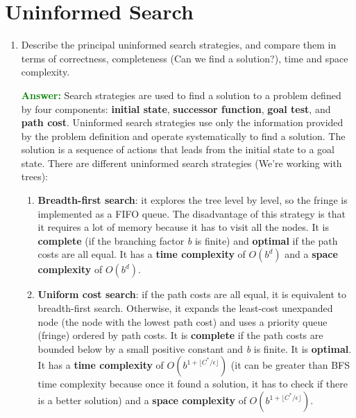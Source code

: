 \documentclass[12pt]{article}
\begin{document}
\section{Uninformed Search}
\begin{enumerate}[label=\textbf{US.\arabic*}]
    \item Describe the principal uninformed search strategies,
          and compare them in terms of correctness, completeness (Can we find a solution?), time and space complexity.

          \textcolor{green}{\textbf{Answer:}}
          Search strategies are used to find a solution to a problem defined by four components:
          \textbf{initial state}, \textbf{successor function}, \textbf{goal test}, and \textbf{path cost}.
          Uninformed search strategies use only the information provided by the problem definition and operate systematically to find a solution.
          The solution is a sequence of actions that leads from the initial state to a goal state.
          There are different uninformed search strategies (We're working with trees):
          \begin{enumerate}
              \item \textbf{Breadth-first search}: it explores the tree level by level,
                    so the fringe is implemented as a FIFO queue.
                    The disadvantage of this strategy is that it requires a lot of memory because it has to visit all the nodes.
                    It is \textbf{complete} (if the branching factor \textit{b} is finite) and \textbf{optimal} if the path costs are all equal.
                    It has a \textbf{time complexity} of $O(b^d)$ and a \textbf{space complexity} of $O(b^d)$.

              \item \textbf{Uniform cost search}: if the path costs are all equal, it is equivalent to breadth-first search.
                    Otherwise, it expands the least-cost unexpanded node (the node with the lowest path cost) and uses a priority queue (fringe)
                    ordered by path costs.
                    It is \textbf{complete} if the path costs are bounded below by a small positive constant and \textit{b} is finite.
                    It is \textbf{optimal}.
                    It has a \textbf{time complexity} of $O(b^{1+\lfloor C^*/\epsilon \rfloor})$ (it can be greater than BFS time complexity because once it found a solution, it has to check if there is a better solution)
                    and a \textbf{space complexity} of $O(b^{1+\lfloor C^*/\epsilon \rfloor})$.


\end{enumerate}
\end{enumerate}
\end{document}
